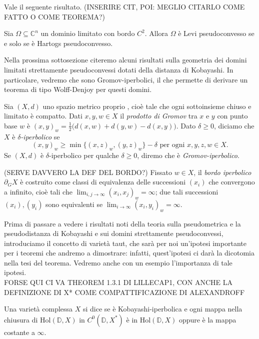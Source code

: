 Vale il seguente risultato. (INSERIRE CIT, POI: MEGLIO CITARLO COME FATTO O COME TEOREMA?)
\begin{ftt}
    Sia $\Omega \subseteq \mathbb{C}^n$ un dominio limitato con bordo $C^2$. Allora $\Omega$ è Levi pseudoconvesso se e solo se è Hartogs pseudoconvesso.
\end{ftt}

Nella prossima sottosezione citeremo alcuni risultati sulla geometria dei domini limitati strettamente pseudoconvessi dotati della distanza di Kobayashi. In particolare, vedremo che sono Gromov-iperbolici, il che permette di derivare un teorema di tipo Wolff-Denjoy per questi domini.

\begin{defn}
    Sia $(X,d)$ uno spazio metrico proprio , cioè tale che ogni sottoinsieme chiuso e limitato è compatto. Dati $x,y,w \in X$ il \textit{prodotto di Gromov} tra $x$ e $y$ con punto base $w$ è $(x,y)_w=\frac{1}{2}\big(d(x,w)+d(y,w)-d(x,y)\big)$. Dato $\delta \ge 0$, diciamo che $X$ è \textit{$\delta$-iperbolico} se
    $$(x,y)_w \ge \min\{(x,z)_w,(y,z)_w\}-\delta\text{ per ogni }x,y,z,w \in X.$$
    Se $(X,d)$ è $\delta$-iperbolico per qualche $\delta \ge 0$, diremo che è \textit{Gromov-iperbolico}.

    (SERVE DAVVERO LA DEF DEL BORDO?) Fissato $w \in X$, il \textit{bordo iperbolico} $\partial_GX$ è costruito come classi di equivalenza delle successioni $(x_i)$ che convergono a infinito, cioè tali che $\displaystyle\lim_{i,j\rightarrow \infty}(x_i,x_j)_w=\infty$; due tali successioni $(x_i), (y_i)$ sono equivalenti se $\displaystyle\lim_{i\rightarrow \infty}(x_i,y_i)_w=\infty$.
\end{defn}

Prima di passare a vedere i risultati noti della teoria sulla pseudometrica e la pseudodistanza di Kobayashi e sui domini strettamente pseudoconvessi, introduciamo il concetto di varietà taut, che sarà per noi un'ipotesi importante per i teoremi che andremo a dimostrare: infatti, quest'ipotesi ci darà la dicotomia nella tesi del teorema. Vedremo anche con un esempio l'importanza di tale ipotesi. \\

FORSE QUI CI VA THEOREM 1.3.1 DI LILLECAP1, CON ANCHE LA DEFINIZIONE DI X* COME COMPATTIFICAZIONE DI ALEXANDROFF

\begin{defn}
    Una varietà complessa $X$ si dice  se è Kobayashi-iperbolica e ogni mappa nella chiusura di $\text{Hol}(\mathbb{D},X)$ in $C^0(\mathbb{D},X^*)$ è in $\text{Hol}(\mathbb{D},X)$ oppure è la mappa costante a $\infty$.
\end{defn}


